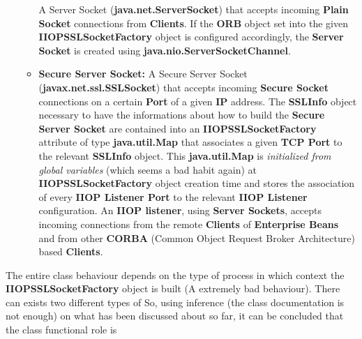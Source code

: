 \begin{itemize}
\begin{itemize}
				A Server Socket (\textbf{java.net.ServerSocket}) that accepts incoming \textbf{Plain Socket} connections from \textbf{Clients}. If the \textbf{ORB} object set into the given \textbf{IIOPSSLSocketFactory} object is configured accordingly, the \textbf{Server Socket} is created using \textbf{java.nio.ServerSocketChannel}.
			\item \textbf{Secure Server Socket:}
				A Secure Server Socket (\textbf{javax.net.ssl.SSLSocket}) that accepts incoming \textbf{Secure Socket} connections on a certain \textbf{Port} of a given \textbf{IP} address.
				The \textbf{SSLInfo} object necessary to have the informations about how to build the \textbf{Secure Server Socket} are contained into an \textbf{IIOPSSLSocketFactory} attribute of type \textbf{java.util.Map} that associates a given \textbf{TCP Port} to the relevant \textbf{SSLInfo} object.
				This \textbf{java.util.Map} is \textit{initialized from global variables} (which seems a bad habit again) at \textbf{IIOPSSLSocketFactory} object creation time and stores the association of every \textbf{IIOP Listener Port} to the relevant \textbf{IIOP Listener} configuration.
				An \textbf{IIOP listener}, using \textbf{Server Sockets}, accepts incoming connections from the remote \textbf{Clients} of \textbf{Enterprise Beans} and from other \textbf{CORBA} (Common Object Request Broker Architecture) based \textbf{Clients}.
		\end{itemize}
\end{itemize}



The entire class behaviour depends on the type of process in which context the \textbf{IIOPSSLSocketFactory} object is built (A extremely bad behaviour).
There can exists two different types of 
So, using inference (the class documentation is not enough) on what has been discussed about so far, it can be concluded that the class functional role is 

